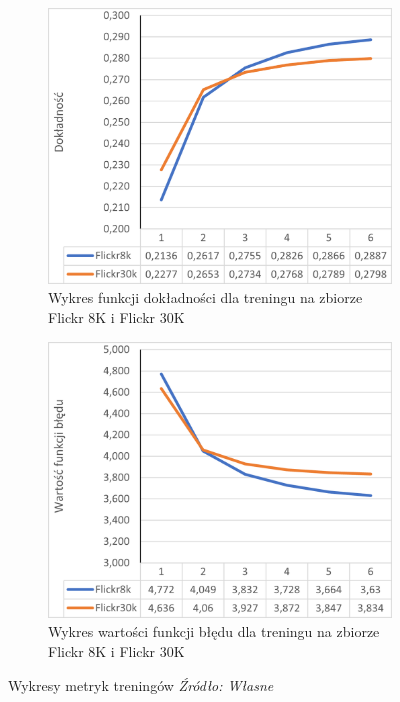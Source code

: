 \begin{figure}[h]
\centering
\begin{subfigure}[b]{.45\linewidth}
\includegraphics[width=\linewidth ,keepaspectratio]{./files/dokladnosc.png}
	\caption{Wykres funkcji dokładności dla treningu na zbiorze Flickr 8K i Flickr 30K}\label{f8kloss}
\end{subfigure}
\begin{subfigure}[b]{.45\linewidth}
	\includegraphics[width=\linewidth ,keepaspectratio]{./files/blad.png}
	\caption{Wykres wartości funkcji błędu dla treningu na zbiorze Flickr 8K i Flickr 30K}\label{f30kloss}
\end{subfigure}
\caption{Wykresy metryk treningów \textit{Źródło: Własne}}
\label{loss}
\end{figure}

